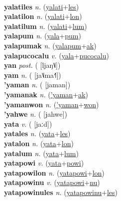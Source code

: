  \label{yalati} \\
\textbf{yalatiles} \textit{n.} (\hyperref[yalati]{yalati}+\hyperref[les]{les})
 \label{yalatiles} \\
\textbf{yalatilon} \textit{n.} (\hyperref[yalati]{yalati}+\hyperref[lon]{lon})
 \label{yalatilon} \\
\textbf{yalatilum} \textit{n.} (\hyperref[yalati]{yalati}+\hyperref[lum]{lum})
 \label{yalatilum} \\
\textbf{yalapum} \textit{n.} (\hyperref[yala]{yala}+\hyperref[pum]{pum})
 \label{yalapum} \\
\textbf{yalapumak} \textit{n.} (\hyperref[yalapum]{yalapum}+\hyperref[ak]{ak})
 \label{yalapumak} \\
\textbf{yalapucocalu} \textit{v.} (\hyperref[yala]{yala}+\hyperref[pucocalu]{pucocalu})
 \label{yalapucocalu} \\
\textbf{yan} \textit{post.} ( [ljaŋ˥˩])
 \label{yan} \\
\textbf{yam} \textit{n.} ( [ja˥˩ma˧˥])
 \label{yam} \\
\textbf{'yaman} \textit{n.} ( [jaman])
 \label{'yaman} \\
\textbf{'yamanak} \textit{n.} (\hyperref['yaman]{'yaman}+\hyperref[ak]{ak})
 \label{'yamanak} \\
\textbf{'yamanwon} \textit{n.} (\hyperref['yaman]{'yaman}+\hyperref[won]{won})
 \label{'yamanwon} \\
\textbf{'yahwe} \textit{n.} ( [jahwe])
 \label{'yahwe} \\
\textbf{yata} \textit{v.} ( [jaːd])
 \label{yata} \\
\textbf{yatales} \textit{n.} (\hyperref[yata]{yata}+\hyperref[les]{les})
 \label{yatales} \\
\textbf{yatalon} \textit{n.} (\hyperref[yata]{yata}+\hyperref[lon]{lon})
 \label{yatalon} \\
\textbf{yatalum} \textit{n.} (\hyperref[yata]{yata}+\hyperref[lum]{lum})
 \label{yatalum} \\
\textbf{yatapowi} \textit{v.} (\hyperref[yata]{yata}+\hyperref[powi]{powi})
 \label{yatapowi} \\
\textbf{yatapowilon} \textit{n.} (\hyperref[yatapowi]{yatapowi}+\hyperref[lon]{lon})
 \label{yatapowilon} \\
\textbf{yatapowinu} \textit{v.} (\hyperref[yatapowi]{yatapowi}+\hyperref[nu]{nu})
 \label{yatapowinu} \\
\textbf{yatapowinules} \textit{n.} (\hyperref[yatapowinu]{yatapowinu}+\hyperref[les]{les})
